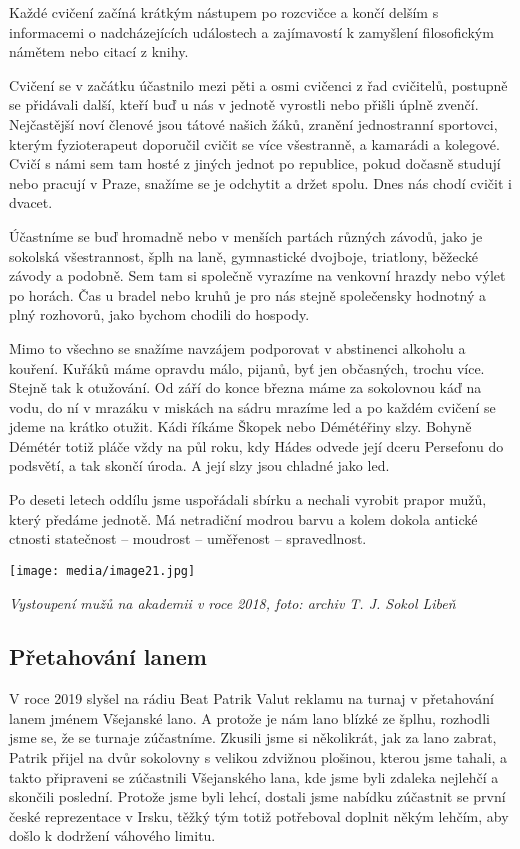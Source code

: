 Každé cvičení začíná krátkým nástupem po rozcvičce a končí delším s
informacemi o nadcházejících událostech a zajímavostí k zamyšlení
filosofickým námětem nebo citací z knihy.

Cvičení se v začátku účastnilo mezi pěti a osmi cvičenci z řad
cvičitelů, postupně se přidávali další, kteří buď u nás v jednotě
vyrostli nebo přišli úplně zvenčí. Nejčastější noví členové jsou tátové
našich žáků, zranění jednostranní sportovci, kterým fyzioterapeut
doporučil cvičit se více všestranně, a kamarádi a kolegové. Cvičí s námi
sem tam hosté z jiných jednot po republice, pokud dočasně studují nebo
pracují v Praze, snažíme se je odchytit a držet spolu. Dnes nás chodí
cvičit i dvacet.

Účastníme se buď hromadně nebo v menších partách různých závodů, jako je
sokolská všestrannost, šplh na laně, gymnastické dvojboje, triatlony,
běžecké závody a podobně. Sem tam si společně vyrazíme na venkovní
hrazdy nebo výlet po horách. Čas u bradel nebo kruhů je pro nás stejně
společensky hodnotný a plný rozhovorů, jako bychom chodili do hospody.

Mimo to všechno se snažíme navzájem podporovat v abstinenci alkoholu a
kouření. Kuřáků máme opravdu málo, pijanů, byť jen občasných, trochu
více. Stejně tak k otužování. Od září do konce března máme za sokolovnou
káď na vodu, do ní v mrazáku v miskách na sádru mrazíme led a po každém
cvičení se jdeme na krátko otužit. Kádi říkáme Škopek nebo Démétéřiny
slzy. Bohyně Démétér totiž pláče vždy na půl roku, kdy Hádes odvede její
dceru Persefonu do podsvětí, a tak skončí úroda. A její slzy jsou
chladné jako led.

Po deseti letech oddílu jsme uspořádali sbírku a nechali vyrobit prapor
mužů, který předáme jednotě. Má netradiční modrou barvu a kolem dokola
antické ctnosti statečnost -- moudrost -- uměřenost -- spravedlnost.

\texttt{[image: media/image21.jpg]}

\emph{Vystoupení mužů na akademii v roce 2018, foto: archiv T. J. Sokol
Libeň}

\subsection{Přetahování lanem}\label{pux159etahovuxe1nuxed-lanem}

V roce 2019 slyšel na rádiu Beat Patrik Valut reklamu na turnaj v
přetahování lanem jménem Všejanské lano. A protože je nám lano blízké ze
šplhu, rozhodli jsme se, že se turnaje zúčastníme. Zkusili jsme si
několikrát, jak za lano zabrat, Patrik přijel na dvůr sokolovny s
velikou zdvižnou plošinou, kterou jsme tahali, a takto připraveni se
zúčastnili Všejanského lana, kde jsme byli zdaleka nejlehčí a skončili
poslední. Protože jsme byli lehcí, dostali jsme nabídku zúčastnit se
první české reprezentace v Irsku, těžký tým totiž potřeboval doplnit
někým lehčím, aby došlo k dodržení váhového limitu.

